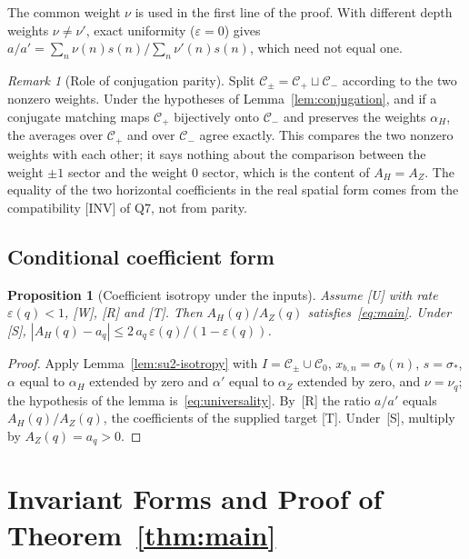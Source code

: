 \documentclass[12pt,a4paper]{article}
\newtheorem{proposition}[theorem]{Proposition}
\theoremstyle{definition}
\theoremstyle{remark}
\newtheorem{remark}[theorem]{Remark}
\newcommand{\Cpm}{\mathcal{C}_{\pm}}
\newcommand{\Czero}{\mathcal{C}_{0}}
\begin{document}
      The common weight $\nu$ is used in the first line of the proof.
      With different depth weights $\nu \neq \nu'$, exact uniformity ($\varepsilon = 0$) gives
      $a/a' = \sum_n \nu(n)s(n) / \sum_n \nu'(n)s(n)$, which need not equal one.

      \begin{remark}[Role of conjugation parity]\label{rem:biparity-role}
        Split $\Cpm = \mathcal{C}_+ \sqcup \mathcal{C}_-$ according to the two nonzero weights.
        Under the hypotheses of Lemma~\ref{lem:conjugation}, and if a conjugate matching maps $\mathcal{C}_+$
        bijectively onto $\mathcal{C}_-$ and preserves the weights $\alpha_H$, the averages over
        $\mathcal{C}_+$ and over
        $\mathcal{C}_-$ agree exactly.
        This compares the two nonzero weights with each other; it says nothing about the comparison between the
        weight $\pm 1$ sector and the weight $0$ sector, which is the content of $A_H = A_Z$.
        The equality of the two horizontal coefficients in the real spatial form comes from the compatibility [INV]
        of Q7, not from parity.
      \end{remark}

    \subsection{Conditional coefficient form}

      \begin{proposition}[Coefficient isotropy under the inputs]\label{prop:conditional-isotropy}
        Assume \textup{[U]} with rate $\varepsilon(q) < 1$, \textup{[W]}, \textup{[R]} and \textup{[T]}.
        Then $A_H(q)/A_Z(q)$ satisfies~\eqref{eq:main}.
        Under \textup{[S]}, $|A_H(q) - a_q| \leq 2\,a_q\,\varepsilon(q)/(1-\varepsilon(q))$.
      \end{proposition}

      \begin{proof}
        Apply Lemma~\ref{lem:su2-isotropy} with $I = \Cpm \cup \Czero$, $x_{b,n} = \sigma_b(n)$, $s = \sigma_*$,
        $\alpha$ equal to $\alpha_H$ extended by zero and $\alpha'$ equal to $\alpha_Z$ extended by zero, and
        $\nu = \nu_q$; the hypothesis of the lemma is~\eqref{eq:universality}.
        By~[R] the ratio $a/a'$ equals $A_H(q)/A_Z(q)$, the coefficients of the supplied target [T].
        Under~[S], multiply by $A_Z(q) = a_q > 0$.
      \end{proof}

  \section{Invariant Forms and Proof of Theorem~\ref{thm:main}}\label{sec:casimir}
\end{document}
